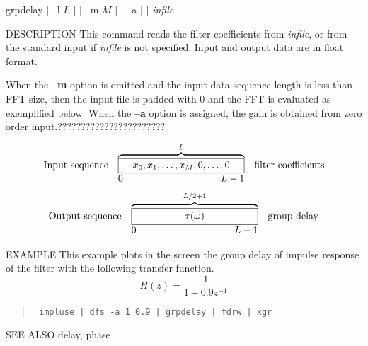 \begin{synopsis}
 \item[grpdelay] [ --l $L$ ] [ --m $M$ ] [ --a ] [ {\em infile} ] 
\end{synopsis}

\begin{qsection}{DESCRIPTION}
This command reads the filter coefficients from {\em infile},
or from the standard input if {\em infile} is not specified.
Input and output data are in float format.
\par
When the {\bf --m} option is omitted
and the input data sequence length is less than FFT size,
then the input file is padded with 0 and the FFT is evaluated
as exemplified below.
When the {\bf --a} option is assigned,
the gain is obtained from zero order input.???????????????????????
\par
\[
\begin{array}{lll}
\mbox{Input sequence} & 
\overbrace{\framebox[4.5cm]{$x_0, x_1, \ldots, x_{M}, 0,
					\ldots,0$}}^{L}  & \mbox{filter coefficients}\\
		& \makebox[4.5cm]{0\hfill $L-1$} &
\end{array}
\]
\[
\begin{array}{lll}
\mbox{Output sequence} & \overbrace{\framebox[4.5cm]{$\tau(\omega)$}}^{L/2+1} &
	   \mbox{group delay}\\
		& \makebox[4.5cm]{0\hfill $L-1$} &

\end{array}
\]
\end{qsection}

\begin{options}
\end{options}


\begin{qsection}{EXAMPLE}
This example plots in the screen the group delay of impulse response
of the filter with the following transfer function.
\begin{displaymath}
  H(z)=\frac{1}{1+0.9z^{-1}}
\end{displaymath}
\begin{quote}
\verb! impluse | dfs -a 1 0.9 | grpdelay | fdrw | xgr !
\end{quote}  
\end{qsection}

\begin{qsection}{SEE ALSO}
delay, phase
\end{qsection}
